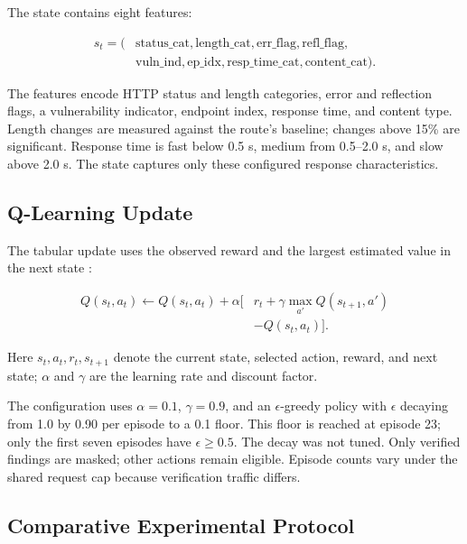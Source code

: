 \documentclass[conference, a4paper]{IEEEtran}
\begin{document}
The state contains eight features:

\begin{equation}
\begin{split}
s_t = (&\text{status\_cat},
\text{length\_cat},
\text{err\_flag},
\text{refl\_flag},\\
&\text{vuln\_ind},
\text{ep\_idx},
\text{resp\_time\_cat},
\text{content\_cat}).
\end{split}
\label{eq:state}
\end{equation}

The features encode HTTP status and length categories, error and
reflection flags, a vulnerability indicator, endpoint index, response
time, and content type. Length changes are measured against the route's
baseline; changes above 15\% are significant. Response time is fast
below 0.5 s, medium from 0.5--2.0 s, and slow above 2.0 s. The state
captures only these configured response characteristics.

\subsection{Q-Learning Update}

The tabular update uses the observed reward and the largest estimated
value in the next state \cite{sutton2018}:

\begin{equation}
\begin{aligned}
Q(s_t,a_t) \leftarrow Q(s_t,a_t) + \alpha[&r_t + \gamma \max_{a'} Q(s_{t+1},a')\\
&- Q(s_t,a_t)].
\end{aligned}
\label{eq:ql}
\end{equation}

Here $s_t,a_t,r_t,s_{t+1}$ denote the current state, selected action,
reward, and next state; $\alpha$ and $\gamma$ are the learning rate
and discount factor.

The configuration uses $\alpha=0.1$, $\gamma=0.9$, and an
$\epsilon$-greedy policy with $\epsilon$ decaying from 1.0 by 0.90
per episode to a 0.1 floor. This floor is reached at episode 23; only
the first seven episodes have $\epsilon\geq0.5$. The decay was not
tuned. Only verified findings are masked; other actions remain
eligible. Episode counts vary under the shared request cap because
verification traffic differs.

\subsection{Comparative Experimental Protocol}
\end{document}
